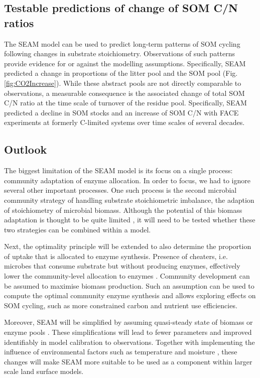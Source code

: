 \subsection{Testable predictions of change of SOM C/N ratios}
The SEAM model can be used to predict long-term patterns of SOM cycling following
changes in substrate stoichiometry. Observations of such patterns provide evidence
for or against the modelling assumptions.
Specifically, SEAM predicted a change in proportions of the litter pool and the
SOM pool (Fig. \ref{fig:CO2Increase}). While these abstract pools are not
directly comparable to observations, a measurable consequence is the associated
change of total SOM C/N ratio at the time scale of turnover of the residue
pool. Specifically, SEAM predicted a decline in SOM stocks and an increase of
SOM C/N with FACE experiments at formerly C-limited systems over time scales of
several decades.
 
\subsection{Outlook} 
The biggest limitation of the SEAM model is its focus on a single process:
community adaptation of enzyme allocation. In order to focus, we had to ignore
several other important processes. One such process is the second microbial
community strategy of handling substrate stoichiometric imbalance,
the adaption of stoichiometry of microbial biomass. Although the potential of this biomass
adaptation is thought to be quite limited \citep{Mooshammer14}, it will need to be
tested whether these two strategies can be combined within a model.

Next, the optimality principle will be extended to also determine the proportion
of uptake that is allocated to enzyme synthesis. Presence of cheaters, i.e.
microbes that consume substrate but without producing enzymes, effectively lower
the community-level allocation to enzymes \citep{Kaiser14}. Community
development can be assumed to maximise biomass production. Such an assumption
can be used to compute the optimal community enzyme synthesis and allows
exploring effects on SOM cycling, such as more constrained carbon and nutrient
use efficiencies.

Moreover, SEAM will be simplified by assuming quasi-steady state of biomass or
enzyme pools \citep{Wutzler13}. These simplifications will lead to fewer
parameters and improved identifiably in model calibration to observations.
Together with implementing the influence of environmental factors such as
temperature and moisture \citep{Davidson12}, these changes will make SEAM more
suitable to be used as a component within larger scale land surface models.
 
